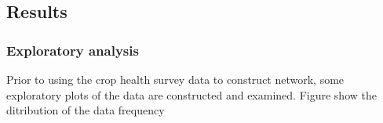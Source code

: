 \subsection*{Results}
\subsubsection{Exploratory analysis}
Prior to using the crop health survey data to construct network, some exploratory plots of the data are constructed and examined. Figure show the ditribution of the data frequency 